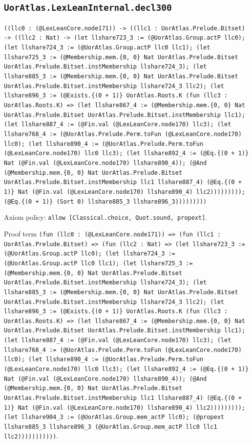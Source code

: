 \documentclass[11pt]{article}
\begin{document}
\subsection*{\texttt{UorAtlas.LexLeanInternal.decl300}}
\noindent\texttt{((llc0 : (@LexLeanCore.node171)) -> ((llc1 : UorAtlas.Prelude.Bitset) -> ((llc2 : Nat) -> (let llshare723\_3 := (@UorAtlas.Group.actP llc0); (let llshare724\_3 := (@UorAtlas.Group.actP llc0 llc1); (let llshare725\_3 := (@Membership.mem.\{0, 0\} Nat UorAtlas.Prelude.Bitset UorAtlas.Prelude.Bitset.instMembership llshare724\_3); (let llshare885\_3 := (@Membership.mem.\{0, 0\} Nat UorAtlas.Prelude.Bitset UorAtlas.Prelude.Bitset.instMembership llshare724\_3 llc2); (let llshare896\_3 := (@Exists.\{(0 + 1)\} UorAtlas.Roots.K (fun (llc3 : UorAtlas.Roots.K) => (let llshare867\_4 := (@Membership.mem.\{0, 0\} Nat UorAtlas.Prelude.Bitset UorAtlas.Prelude.Bitset.instMembership llc1); (let llshare887\_4 := (@Fin.val (@LexLeanCore.node170) llc3); (let llshare768\_4 := (@UorAtlas.Prelude.Perm.toFun (@LexLeanCore.node170) llc0); (let llshare890\_4 := (@UorAtlas.Prelude.Perm.toFun (@LexLeanCore.node170) llc0 llc3); (let llshare892\_4 := (@Eq.\{(0 + 1)\} Nat (@Fin.val (@LexLeanCore.node170) llshare890\_4)); (@And (@Membership.mem.\{0, 0\} Nat UorAtlas.Prelude.Bitset UorAtlas.Prelude.Bitset.instMembership llc1 llshare887\_4) (@Eq.\{(0 + 1)\} Nat (@Fin.val (@LexLeanCore.node170) llshare890\_4) llc2))))))))); (@Eq.\{(0 + 1)\} (Sort 0) llshare885\_3 llshare896\_3)))))))))}\par
\noindent Axiom policy: \texttt{allow [Classical.choice, Quot.sound, propext]}.\par
\noindent Proof term \texttt{(fun (llc0 : (@LexLeanCore.node171)) => (fun (llc1 : UorAtlas.Prelude.Bitset) => (fun (llc2 : Nat) => (let llshare723\_3 := (@UorAtlas.Group.actP llc0); (let llshare724\_3 := (@UorAtlas.Group.actP llc0 llc1); (let llshare725\_3 := (@Membership.mem.\{0, 0\} Nat UorAtlas.Prelude.Bitset UorAtlas.Prelude.Bitset.instMembership llshare724\_3); (let llshare885\_3 := (@Membership.mem.\{0, 0\} Nat UorAtlas.Prelude.Bitset UorAtlas.Prelude.Bitset.instMembership llshare724\_3 llc2); (let llshare896\_3 := (@Exists.\{(0 + 1)\} UorAtlas.Roots.K (fun (llc3 : UorAtlas.Roots.K) => (let llshare867\_4 := (@Membership.mem.\{0, 0\} Nat UorAtlas.Prelude.Bitset UorAtlas.Prelude.Bitset.instMembership llc1); (let llshare887\_4 := (@Fin.val (@LexLeanCore.node170) llc3); (let llshare768\_4 := (@UorAtlas.Prelude.Perm.toFun (@LexLeanCore.node170) llc0); (let llshare890\_4 := (@UorAtlas.Prelude.Perm.toFun (@LexLeanCore.node170) llc0 llc3); (let llshare892\_4 := (@Eq.\{(0 + 1)\} Nat (@Fin.val (@LexLeanCore.node170) llshare890\_4)); (@And (@Membership.mem.\{0, 0\} Nat UorAtlas.Prelude.Bitset UorAtlas.Prelude.Bitset.instMembership llc1 llshare887\_4) (@Eq.\{(0 + 1)\} Nat (@Fin.val (@LexLeanCore.node170) llshare890\_4) llc2))))))))); (let llshare904\_3 := (@UorAtlas.Group.mem\_actP llc0); (@propext llshare885\_3 llshare896\_3 (@UorAtlas.Group.mem\_actP llc0 llc1 llc2)))))))))))}.\par
\end{document}
